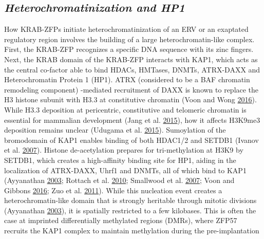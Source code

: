\documentclass[onehalf,12pt]{beavtex}
\begin{document}
  \subsection*{\texorpdfstring{\emph{Heterochromatinization and
  HP1}}{Heterochromatinization and HP1}}\label{heterochromatinization-and-hp1}
  
  How KRAB-ZFPs initiate heterochromatinization of an ERV or an exaptated
  regulatory region involves the building of a large heterochromatin-like
  complex. First, the KRAB-ZFP recognizes a specific DNA sequence with its
  zinc fingers. Next, the KRAB domain of the KRAB-ZFP interacts with KAP1,
  which acts as the central co-factor able to bind HDACs, HMTases, DNMTs,
  ATRX-DAXX and Heterochromatin Protein 1 (HP1). ATRX (considered to be a
  BAF chromatin remodeling component) -mediated recruitment of DAXX is
  known to replace the H3 histone subunit with H3.3 at constitutive
  chromatin (Voon and Wong
  \protect\hyperlink{ref-VoonNewplayersheterochromatin2016}{2016}). While
  H3.3 deposition at pericentric, constitutive and telomeric chromatin is
  essential for mammalian development (Jang et al.
  \protect\hyperlink{ref-JangHistoneH3maintains2015}{2015}), how it
  affects H3K9me3 deposition remains unclear (Udugama et al.
  \protect\hyperlink{ref-UdugamaHistonevariantH32015}{2015}). Sumoylation
  of the bromodomain of KAP1 enables binding of both HDAC1/2 and SETDB1
  (Ivanov et al.
  \protect\hyperlink{ref-IvanovPHDDomainMediatedE32007}{2007}). Histone
  de-acetylation prepares for tri-methylation at H3K9 by SETDB1, which
  creates a high-affinity binding site for HP1, aiding in the localization
  of ATRX-DAXX, Uhrf1 and DNMTs, all of which bind to KAP1 (Ayyanathan
  \protect\hyperlink{ref-AyyanathanRegulatedrecruitmentHP12003a}{2003};
  Rottach et al.
  \protect\hyperlink{ref-RottachmultidomainproteinNp952010}{2010};
  Smallwood et al.
  \protect\hyperlink{ref-SmallwoodFunctionalcooperationHP12007}{2007};
  Voon and Gibbons
  \protect\hyperlink{ref-VoonMaintainingmemorysilencing2016}{2016}; Zuo et
  al. \protect\hyperlink{ref-Zuozincfingerprotein2011}{2011}). While this
  nucleation event creates a heterochromatin-like domain that is strongly
  heritable through mitotic divisions (Ayyanathan
  \protect\hyperlink{ref-AyyanathanRegulatedrecruitmentHP12003a}{2003}),
  it is spatially restricted to a few kilobases. This is often the case at
  imprinted differentially methylated regions (DMRs), where ZFP57 recruits
  the KAP1 complex to maintain methylation during the pre-implantation
\end{document}
